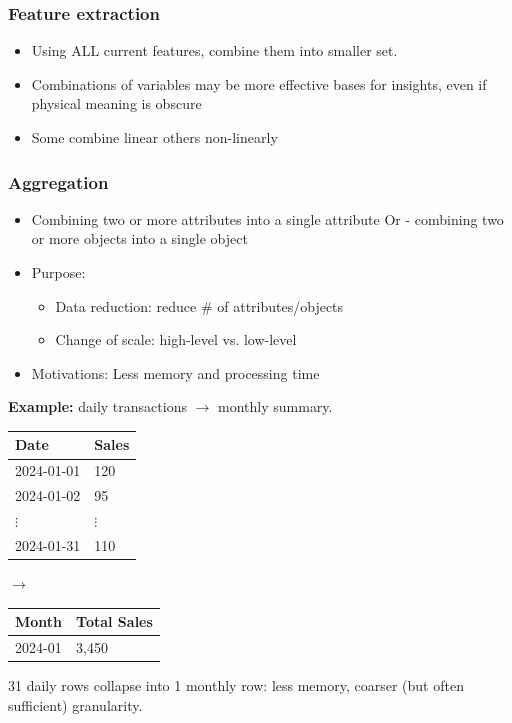 \begin{frame}[fragile]\frametitle{Feature extraction}
	\begin{itemize}
	\item Using ALL current features, combine them into smaller set. 
	\item Combinations of variables may be more effective bases for insights, even if physical meaning is obscure
	\item Some combine linear others non-linearly
	\end{itemize}
\end{frame}





\begin{frame}[fragile]\frametitle{Aggregation}
\begin{itemize}
\item Combining two or more attributes into a single attribute Or - combining two or more objects into a single object
\item Purpose:
	\begin{itemize}
	\item Data reduction: reduce \# of attributes/objects
	\item Change of scale: high-level vs. low-level
	\end{itemize}
\item Motivations: Less memory and processing time
\end{itemize}
\textbf{Example:} daily transactions $\rightarrow$ monthly summary.
\begin{center}
\begin{tabular}{ll}
\toprule
Date & Sales \\
\midrule
2024-01-01 & 120 \\
2024-01-02 & 95 \\
$\vdots$ & $\vdots$ \\
2024-01-31 & 110 \\
\bottomrule
\end{tabular}
\quad$\rightarrow$\quad
\begin{tabular}{ll}
\toprule
Month & Total Sales \\
\midrule
2024-01 & 3{,}450 \\
\bottomrule
\end{tabular}
\end{center}
31 daily rows collapse into 1 monthly row: less memory, coarser (but often sufficient)
granularity.
\end{frame}


